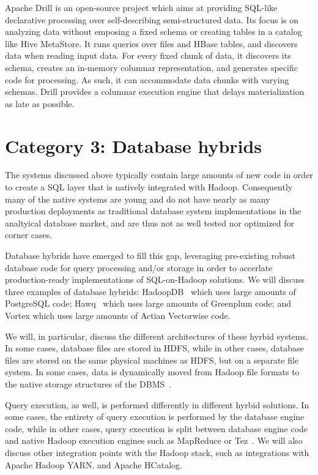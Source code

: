 \documentclass{vldb}
\begin{document}
Apache Drill \cite{drill} is an open-source project which aims at providing SQL-like declarative processing over self-describing semi-structured data. Its focus is on analyzing data without emposing a fixed schema or creating tables in a catalog like Hive MetaStore. It runs queries over files and HBase tables, and discovers data when reading input data. For every fixed chunk of data, it discovers its schema, creates an in-memory columnar representation, and generates specific code for processing. As such, it can accommodate data chunks with varying schemas. Drill provides a columnar execution engine that delays materialization as late as possible.

\section{Category 3: Database hybrids}
The systems discussed above typically contain large amounts of
new code in order to create a SQL layer that is natively integrated
with Hadoop. Consequently many of the native systems are young and do
not have nearly as many production deployments as traditional database system
implementations in the analtyical database market, and are thus not as
well tested nor optimized for corner cases.

Database hybrids have emerged to fill this gap, leveraging
pre-existing robust database code for query processing and/or storage
in order to accerlate production-ready implementations of
SQL-on-Hadoop solutions. We will discuss three examples of database
hybrids: HadoopDB~\cite{hadoopdb} which uses large amounts of
PostgreSQL code; Hawq~\cite{hawq} which uses large amounts of
Greenplum code; and Vortex which uses large amounts of Actian
Vectorwise code. 

We will, in particular, discuss the different architectures of these
hyrbid systems. In some cases, database files are stored in HDFS,
while in
other cases, database files are stored on the same physical machines
as HDFS, but on a separate file system. In some cases, data is
dynamically moved from Hadoop file formats to the native storage
structures of the DBMS~\cite{invisible-loading}.

Query execution, as well, is performed differently in different hyrbid
solutions. In some cases,
the entirety of 
query execution is performed by the database engine code, while in
other cases, query execution is split between database engine code and
native Hadoop execution engines such as MapReduce or Tez~\cite{split-execution}. We will also
discuss other integration points with the Hadoop stack, such as
integrations with Apache Hadoop YARN, and Apache HCatalog.
\end{document}
